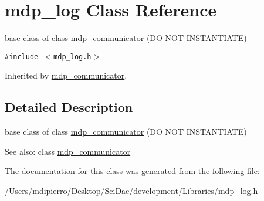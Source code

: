 \hypertarget{classmdp__log}{
\section{mdp\_\-log Class Reference}
\label{classmdp__log}
}
base class of class \hyperlink{classmdp__communicator}{mdp\_\-communicator} (DO NOT INSTANTIATE)  


{\tt \#include $<$mdp\_\-log.h$>$}

Inherited by \hyperlink{classmdp__communicator}{mdp\_\-communicator}.



\subsection{Detailed Description}
base class of class \hyperlink{classmdp__communicator}{mdp\_\-communicator} (DO NOT INSTANTIATE) 

\begin{Desc}
\item[See also:]class \hyperlink{classmdp__communicator}{mdp\_\-communicator} \end{Desc}


The documentation for this class was generated from the following file:\begin{CompactItemize}
\item 
/Users/mdipierro/Desktop/SciDac/development/Libraries/\hyperlink{mdp__log_8h}{mdp\_\-log.h}\end{CompactItemize}
